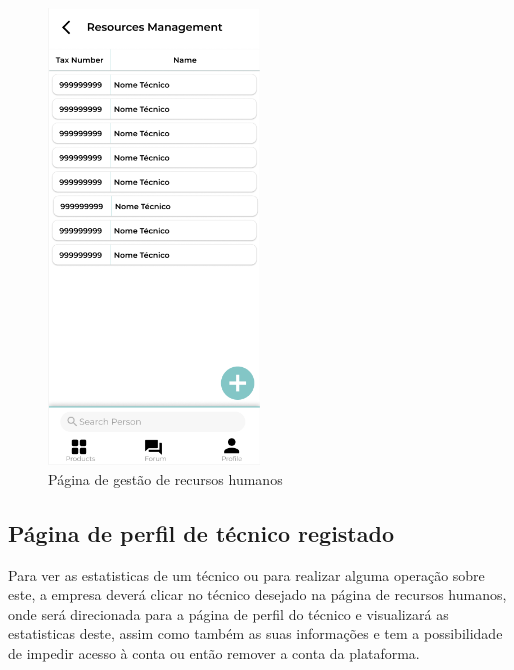 \begin{figure}[htb]
    \centering
    \includegraphics[width=0.5\textwidth]{images/mockups/human_resources.png}
    \caption{Página de gestão de recursos humanos}
    \label{fig:24}
\end{figure}

\newpage

\subsection{Página de perfil de técnico registado}

Para ver as estatisticas de um técnico ou para realizar alguma operação sobre este, a empresa deverá
clicar no técnico desejado na página de recursos humanos, onde será direcionada para a página de perfil do
técnico e visualizará as estatisticas deste, assim como também as suas informações e tem a possibilidade
de impedir acesso à conta ou então remover a conta da plataforma.

